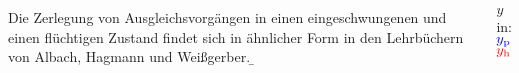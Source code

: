 \begin{frame}
\begin{columns}
{    %
    Die Zerlegung von Ausgleichsvorgängen in einen eingeschwungenen und einen flüchtigen Zustand 
    findet sich in ähnlicher Form in den Lehrbüchern von Albach\cite{albach}, Hagmann\cite{hagmann} und Weißgerber\cite{weissgerber3}.  
}%
\b{%
     $y$ in:\\
     ${\color{blue}y_{\mathrm{p}}}$\\
     ${\color{red}y_{\mathrm{h}}}$

}
\end{columns}
\end{frame}
